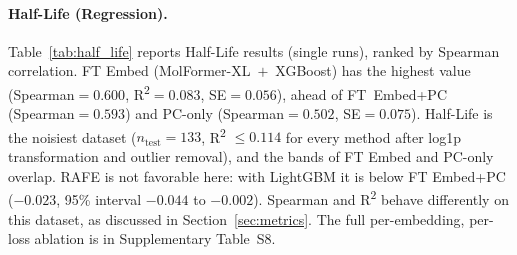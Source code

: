 \documentclass[pdflatex,sn-mathphys-num]{sn-jnl}%
\begin{document}
\begin{table}[!ht]
\centering
\caption{Best configurations on Caco-2 permeability (regression, TDC ADMET Group), ranked by Spearman.}
\label{tab:caco2}
\end{table}

\paragraph{Half-Life (Regression).} Table~\ref{tab:half_life} reports Half-Life results (single runs), ranked by Spearman correlation. FT Embed (MolFormer-XL~$+$~XGBoost) has the highest value (Spearman$=0.600$, R\textsuperscript{2}$=0.083$, SE$=0.056$), ahead of FT~Embed+PC (Spearman$=0.593$) and PC-only (Spearman$=0.502$, SE$=0.075$). Half-Life is the noisiest dataset ($n_\text{test}=133$, R\textsuperscript{2} $\le 0.114$ for every method after log1p transformation and outlier removal), and the bands of FT Embed and PC-only overlap. RAFE is not favorable here: with LightGBM it is below FT Embed+PC ($-0.023$, 95\% interval $-0.044$ to $-0.002$). Spearman and R\textsuperscript{2} behave differently on this dataset, as discussed in Section~\ref{sec:metrics}. The full per-embedding, per-loss ablation is in Supplementary Table~S8.
\end{document}
